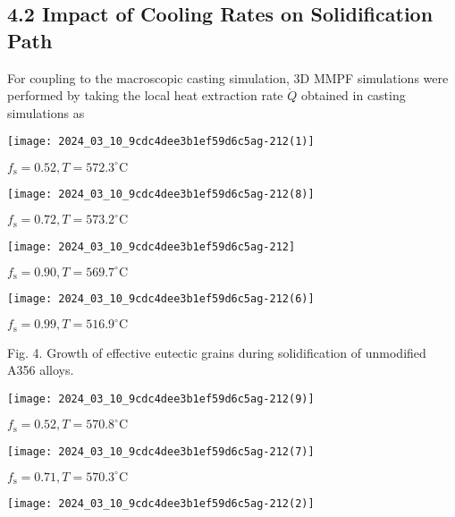 \documentclass[10pt]{article}
\begin{document}
\subsection*{4.2 Impact of Cooling Rates on Solidification Path}
For coupling to the macroscopic casting simulation, 3D MMPF simulations were performed by taking the local heat extraction rate $\dot{Q}$ obtained in casting simulations as

\begin{center}
\texttt{[image: 2024\_03\_10\_9cdc4dee3b1ef59d6c5ag-212(1)]}
\end{center}

$f_{\mathrm{s}}=0.52, T=572.3^{\circ} \mathrm{C}$

\begin{center}
\texttt{[image: 2024\_03\_10\_9cdc4dee3b1ef59d6c5ag-212(8)]}
\end{center}

$f_{\mathrm{s}}=0.72, T=573.2^{\circ} \mathrm{C}$

\begin{center}
\texttt{[image: 2024\_03\_10\_9cdc4dee3b1ef59d6c5ag-212]}
\end{center}

$f_{\mathrm{s}}=0.90, T=569.7^{\circ} \mathrm{C}$

\begin{center}
\texttt{[image: 2024\_03\_10\_9cdc4dee3b1ef59d6c5ag-212(6)]}
\end{center}

$f_{\mathrm{s}}=0.99, T=516.9^{\circ} \mathrm{C}$

Fig. 4. Growth of effective eutectic grains during solidification of unmodified A356 alloys.

\begin{center}
\texttt{[image: 2024\_03\_10\_9cdc4dee3b1ef59d6c5ag-212(9)]}
\end{center}

$f_{\mathrm{s}}=0.52, T=570.8^{\circ} \mathrm{C}$

\begin{center}
\texttt{[image: 2024\_03\_10\_9cdc4dee3b1ef59d6c5ag-212(7)]}
\end{center}

$f_{\mathrm{s}}=0.71, T=570.3^{\circ} \mathrm{C}$

\begin{center}
\texttt{[image: 2024\_03\_10\_9cdc4dee3b1ef59d6c5ag-212(2)]}
\end{center}
\end{document}
